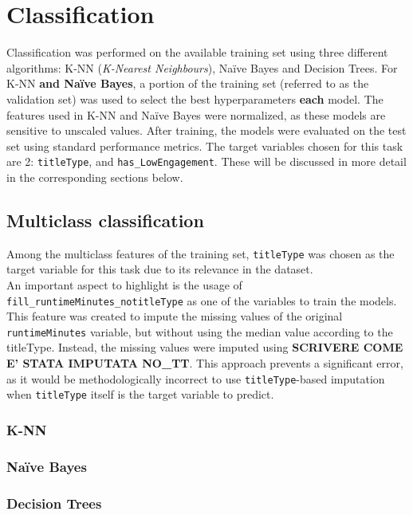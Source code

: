 \chapter{Classification}
\label{ch:capitolo3}
Classification was performed on the available training set using three different algorithms: K-NN (\textit{K-Nearest Neighbours}), Naïve Bayes and Decision Trees.
For K-NN \textbf{and Naïve Bayes}, a portion of the training set (referred to as the validation set) was used to select the best hyperparameters \textbf{each} model.
The features used in K-NN and Naïve Bayes were normalized, as these models are sensitive to unscaled values.
After training, the models were evaluated on the test set using standard performance metrics. 
The target variables chosen for this task are 2: \texttt{titleType}, and \texttt{has\_LowEngagement}.
These will be discussed in more detail in the corresponding sections below.

\section{Multiclass classification}\label{sec:multiclass_classification}
Among the multiclass features of the training set, \texttt{titleType} 
was chosen as the target variable for this task due to its relevance in the dataset.\\
An important aspect to highlight is the usage of \texttt{fill\_runtimeMinutes\_notitleType}
as one of the variables to train the models. 
This feature was created to impute the missing values of the original \texttt{runtimeMinutes} variable,
but without using the median value according to the titleType. Instead, the missing values were imputed using \textbf{SCRIVERE COME E' STATA IMPUTATA NO\_TT}.
This approach prevents a significant error, as it would be methodologically incorrect to use \texttt{titleType}-based 
imputation when \texttt{titleType} itself is the target variable to predict.
\subsection{K-NN}
\subsection{Naïve Bayes}
\subsection{Decision Trees}



